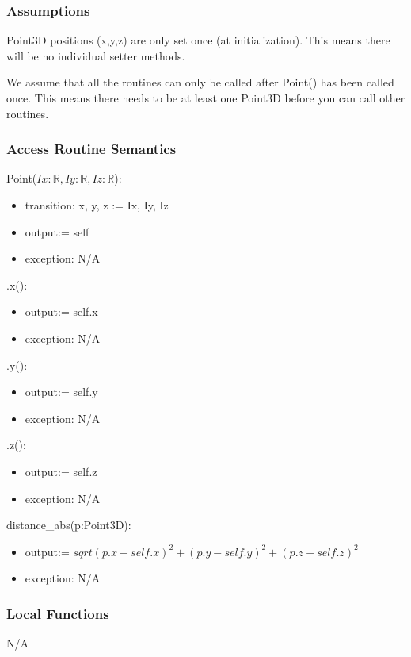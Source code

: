 \documentclass[12pt, titlepage]{article}
\begin{document}
\subsubsection{Assumptions}
Point3D positions (x,y,z) are only set once (at initialization). This means 
there will be no individual setter methods.

We assume that all the routines can only be called after Point() has been 
called once. This means there needs to be at least one Point3D before you can 
call other routines.

\subsubsection{Access Routine Semantics}
\noindent Point($Ix: \mathbb{R}, Iy: \mathbb{R}, Iz: \mathbb{R}$):
\begin{itemize}
	\item transition: x, y, z := Ix, Iy, Iz
	\item output:= self
	\item exception: N/A
\end{itemize}

\noindent .x():
\begin{itemize}
	\item output:= self.x
	\item exception: N/A
\end{itemize}

\noindent .y():
\begin{itemize}
	\item output:= self.y
	\item exception: N/A
\end{itemize}

\noindent .z():
\begin{itemize}
	\item output:= self.z
	\item exception: N/A
\end{itemize} 

\noindent distance\_abs(p:Point3D):
\begin{itemize}
	\item output:= $sqrt{(p.x-self.x)^2 + (p.y-self.y)^2 + (p.z-self.z)^2}$
	\item exception: N/A
\end{itemize} 

\subsubsection{Local Functions}
N/A
\end{document}
